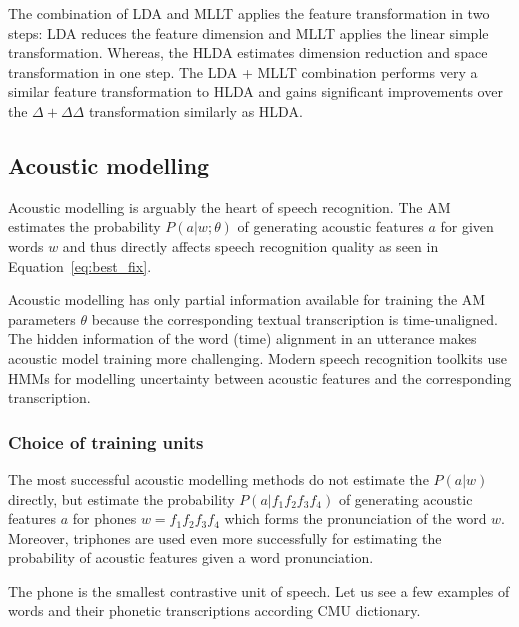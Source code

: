 The combination of \ac{LDA} and \ac{MLLT} applies the feature transformation in two steps: \ac{LDA} reduces the feature dimension and \ac{MLLT} applies the linear simple transformation\cite{gopinath1998maximum}. Whereas, the \ac{HLDA} estimates dimension reduction and space transformation in one step.\cite{gales1999semi} The \ac{LDA} + \ac{MLLT} combination performs very a similar feature transformation to \ac{HLDA} and gains significant improvements over the $\Delta+\Delta\Delta$ transformation similarly as \ac{HLDA}\cite{gales1999semi}\cite{gopinath1998maximum}.


\subsection{Acoustic modelling}
\label{sub:am}
Acoustic modelling is arguably the heart of speech recognition. The \ac{AM} estimates the probability $P(a|w; \theta)$ of generating acoustic features $a$ for given words $w$ and thus directly affects speech recognition quality as seen in Equation~\ref{eq:best_fix}.

Acoustic modelling has only partial information available for training the \ac{AM} parameters $\theta$ because the corresponding textual transcription is time-unaligned. The hidden information of the word (time) alignment in an utterance makes acoustic model training more challenging. Modern speech recognition toolkits use \acl{HMM}s for modelling uncertainty between acoustic features and the corresponding transcription. 

\subsubsection*{Choice of training units}
The most successful acoustic modelling methods do not estimate the $P(a|w)$ directly, but estimate the probability $P(a|f_1f_2f_3f_4)$ of generating acoustic features $a$ for phones $w=f_1f_2f_3f_4$ which forms the pronunciation of the word $w$. Moreover, triphones are used even more successfully for estimating the probability of acoustic features given a word pronunciation.

The phone is the smallest contrastive unit of speech. Let us see a few examples of words and their phonetic transcriptions according CMU dictionary\cite{weide1998cmu}.

